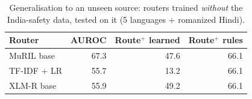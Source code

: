 \begin{table}[t]\centering\footnotesize
\caption{Generalisation to an unseen source: routers trained \emph{without} the India-safety data, tested on it (5 languages + romanized Hindi).}\label{tab:loso}
\begin{tabular}{lrrr}
\toprule
Router & AUROC & Route$^{+}$ learned & Route$^{+}$ rules \\
\midrule
MuRIL base & 67.3 & 47.6 & 66.1 \\
TF-IDF + LR & 55.7 & 13.2 & 66.1 \\
XLM-R base & 55.9 & 49.2 & 66.1 \\
\bottomrule
\end{tabular}
\end{table}
